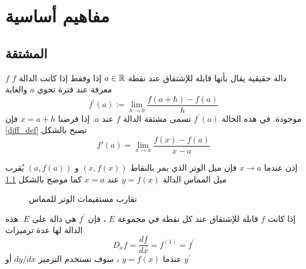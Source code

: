 \chapter{مفاهيم أساسية}
\thispagestyle{empty}
\newpage
\section{المشتقة}

\begin{definition}
    $f$ دالة حقيقية يقال بأنها قابلة للإشتقاق عند نقطة $a\in\mathbb{R}$ إذا وفقط إذا كانت الدالة $f$ معرفة عند فترة تحوي $a$ والغاية
    \begin{equation}
    \label{diff_def}
        f^{\prime}(a):=\lim\limits_{h\rightarrow 0}\frac{f(a+h)-f(a)}{h}
    \end{equation}
    موجودة. في هذه الحالة $f^{\prime}(a)$ تسمى مشتقة الدالة $f$ عند $a$. إذا فرضنا $x=a+h$ فإن \eqref{diff_def} تصبح بالشكل
    \begin{equation*}
        f'(a)=\lim\limits_{x\to a}\frac{f(x)-f(a)}{x-a}
    \end{equation*}
\end{definition}
\noindent
إذن عندما $x\rightarrow a$ فإن ميل الوتر الذي يمر بالنقاط $(x,f(x))$ و $(a,f(a))$ يُقرب ميل المماس الدالة $y=f(x)$ عند $x=a$ كما موضح بالشكل \ref{fig:tangent}
\begin{figure}[ht]
\centering
{}
\caption{تقارب مستقيمات الوتر للمماس}
\label{fig:tangent}
\end{figure}
\begin{note}
    إذا كانت $f$ قابلة للإشتقاق عند كل نقطة في مجموعة $E$ ، فإن $f^{\prime}$ هي دالة على $E$. هذه الدالة لها عدة ترميزات
\[
D_x f= \frac{df}{dx} =f^{(1)}=f^{\prime}
\]
عندما $y=f(x)$ ، سوف نستخدم الترميز $dy/dx$ أو $y^{\prime}$
\end{note}

